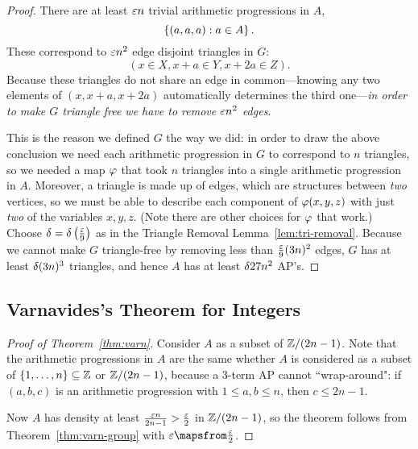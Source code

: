 \begin{proof}
There are at least $\varepsilon n$ trivial arithmetic progressions in $A$,
\[
\left\{{(a,a,a)}:{a\in A}\right\}.
\]
These correspond to $\varepsilon n^2$ edge disjoint triangles in $G$:
\[
(x\in X,x+a\in Y,x+2a\in Z).
\]
Because these triangles do not share an edge in common---knowing any two elements of $(x,x+a,x+2a)$ automatically determines the third one---{\it in order to make $G$ triangle free we have to remove $\varepsilon n^2$ edges}.

This is the reason we defined $G$ the way we did: in order to draw the above conclusion we need each arithmetic progression in $G$ to correspond to $n$ triangles, so we needed a map $\varphi$ that took $n$ triangles into a single arithmetic progression in $A$. Moreover, a triangle is made up of edges, which are structures between {\it two} vertices, so we must be able to describe each component of $\varphi(x,y,z)$ with just {\it two} of the variables $x,y,z$. (Note there are other choices for $\varphi$ that work.)\\

Choose $\delta=\delta\left( {\frac{\varepsilon}{9}} \right)$ as in the Triangle Removal Lemma~\ref{lem:tri-removal}. Because we cannot make $G$ triangle-free by removing less than $\frac{\varepsilon}{9} (3n)^2$ edges, $G$ has at least $\delta (3n)^3$ triangles, and hence $A$ has at least $\delta 27n^2$ AP's.
\end{proof}
\subsection{Varnavides's Theorem for Integers}
\begin{proof}[Proof of Theorem~\ref{thm:varn}]
Consider $A$ as a subset of $\mathbb{Z}/(2n-1)$. Note that the arithmetic progressions in $A$ are the same whether $A$ is considered as a subset of $\{1,\ldots, n\}\subseteq \mathbb{Z}$ or $\mathbb{Z}/(2n-1)$, because a 3-term AP cannot ``wrap-around": if $(a,b,c)$ is an arithmetic progression with $1\le a,b\le n$, then $c\le 2n-1$.

Now $A$ has density at least $\frac{\varepsilon n}{2n-1}>\frac{\varepsilon}{2}$ in $\mathbb{Z}/(2n-1)$, so the theorem follows from Theorem~\ref{thm:varn-group} with $\ep\mapsfrom \fc{\ep}{2}$.
\end{proof}

